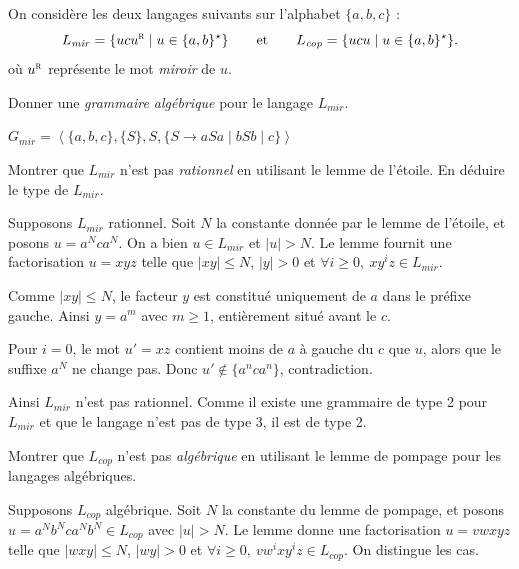 
\begingroup

\begin{exercice}\label{exo:languages/chomsky/copy}

  On considère les deux langages suivants sur l'alphabet $\{a,b,c\}$ :
  $$
  L_{\mathit{mir}} = \{ u c u^{\textsc{r}} \mid u \in \{a,b\}^\star \}
  \qquad\text{et}\qquad
  L_{\mathit{cop}} = \{ u c u \mid u \in \{a,b\}^\star \}.
  $$
  où $u^\textsc{r}$ représente le mot \emph{miroir} de $u$. 

  \begin{questions}
  \item Donner une \emph{grammaire algébrique} pour le langage $L_{\mathit{mir}}$.
  \end{questions}
  \begin{corrections}
    $G_{\mathit{mir}} = \left\langle \{a,b,c\}, \{S\}, S, \{S \to aSa \mid bSb \mid c\} \right\rangle$
  \end{corrections}
  
  \begin{questions}
  \item Montrer que $L_{\mathit{mir}}$ n'est pas \emph{rationnel} 
    en utilisant le lemme de l'étoile. En déduire le type de $L_{\mathit{mir}}$.
  \end{questions}
  \begin{corrections}
    Supposons $L_{\mathit{mir}}$ rationnel.
    Soit $N$ la constante donnée par le lemme de l'étoile, et posons
    $u = a^N c a^N$. On a bien $u\in L_{\mathit{mir}}$ et $|u|>N$.
    Le lemme fournit une factorisation $u = xyz$ telle que
    $|xy| \le N$, $|y| > 0$ et $\forall i \ge 0,\ x y^i z \in L_{\mathit{mir}}$.

    Comme $|xy|\le N$, le facteur $y$ est constitué uniquement de $a$ dans le préfixe gauche.
    Ainsi $y = a^m$ avec $m \ge 1$, entièrement situé avant le $c$.

    Pour $i=0$, le mot $u' = xz$ contient moins de $a$ à gauche du $c$
    que $u$, alors que le suffixe $a^N$ ne change pas.
    Donc $u' \notin \{a^n c a^n\}$, contradiction.

    Ainsi $L_{\mathit{mir}}$ n'est pas rationnel.
    Comme il existe une grammaire de type 2 pour $L_{\mathit{mir}}$ et que le langage n’est pas de type 3,
    il est de type 2.
  \end{corrections}
  
  \begin{questions}
  \item Montrer que $L_{\mathit{cop}}$ n'est pas \emph{algébrique}
    en utilisant le lemme de pompage pour les langages algébriques.
  \end{questions}
  \begin{corrections}
    Supposons $L_{\mathit{cop}}$ algébrique.
    Soit $N$ la constante du lemme de pompage, et posons
    $u = a^N b^N c a^N b^N \in L_{\mathit{cop}}$ avec $|u|>N$.
    Le lemme donne une factorisation $u = v w x y z$ telle que
    $|wxy| \le N$, $|wy| > 0$ et $\forall i\ge 0,\ v w^i x y^i z \in L_{\mathit{cop}}$.
    On distingue les cas.


\end{corrections}
\end{exercice}
